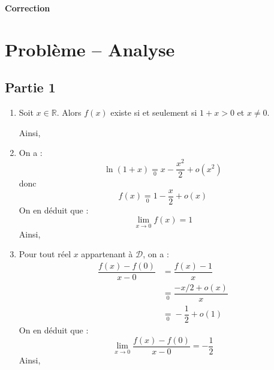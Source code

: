 \documentclass[a4paper,twoside,french,10pt]{VcCours}
\begin{document}

\begin{center}
\large\bf
Correction
\end{center}
\separationTitre


\section*{Problème -- Analyse}


\subsection*{Partie 1}


\begin{enumerate}
\item Soit $x \in \mathbb{R}$. Alors $f(x)$ existe si et seulement si $1+x>0$ et $x \neq 0$.

Ainsi, 
\fbox{$f$ est définie sur $\mathcal{D} = ]-1, 0[ \cup ]0 , + \infty[$}

\item On a :
$$ \boxed{ \ln(1+x) \underset{0}{=} x- \dfrac{x^2}{2} + o(x^2)}$$
donc 
$$ f(x)\underset{0}{=} 1 - \dfrac{x}{2} + o(x)$$
On en déduit que :
$$ \lim_{x \rightarrow 0} f(x) = 1$$
Ainsi,
\item Pour tout réel $x$ appartenant à $\mathcal{D}$, on a :
\begin{align*}
\dfrac{f(x)-f(0)}{x-0} & = \dfrac{f(x)-1}{x} \\
& \underset{0}{=} \dfrac{-x/2+o(x)}{x} \\
& \underset{0}{=} - \dfrac{1}{2} + o(1)
\end{align*}
On en déduit que :
$$ \lim_{x \rightarrow 0} \dfrac{f(x)-f(0)}{x-0} = - \dfrac{1}{2}$$
Ainsi,


\end{enumerate}
\end{document}

